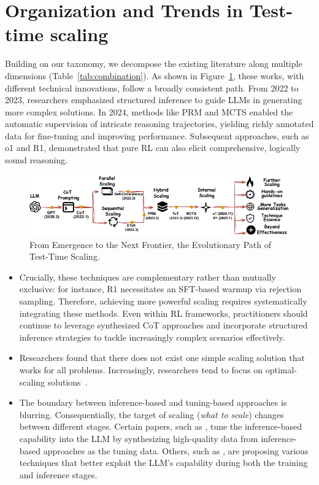 \section{Organization and Trends in Test-time scaling}
\label{sec:organizationandtrends}



Building on our taxonomy, we decompose the existing literature along multiple dimensions (Table~\ref{tab:combination}). As shown in Figure~\ref{fig:timeline}, these works, with different technical innovations, follow a broadly consistent path. From 2022 to 2023, researchers emphasized structured inference to guide LLMs in generating more complex solutions. In 2024, methods like PRM and MCTS enabled the automatic supervision of intricate reasoning trajectories, yielding richly annotated data for fine-tuning and improving \TTS performance. Subsequent approaches, such as o1 and R1, demonstrated that pure RL can also elicit comprehensive, logically sound reasoning. 

\begin{figure}[!htbp]
    \centering
    \includegraphics[width=.98\linewidth]{figures/figure1.pdf}
    \caption{From Emergence to the Next Frontier, the Evolutionary Path of Test-Time Scaling.}
    \label{fig:timeline}
\end{figure}





\begin{itemize}
    \item Crucially, these techniques are complementary rather than mutually exclusive: for instance, R1 necessitates an SFT-based warmup via rejection sampling. Therefore, achieving more powerful scaling requires systematically integrating these methods. Even within RL frameworks, practitioners should continue to leverage synthesized CoT approaches and incorporate structured inference strategies to tackle increasingly complex scenarios effectively.
    \item Researchers found that there does not exist one simple scaling solution that works for all problems. Increasingly, researchers tend to focus on optimal-scaling solutions~\citep{wu2024scaling,snell2024scaling}.
    \item The boundary between inference-based and tuning-based approaches is blurring. Consequentially, the target of scaling (\textit{what to scale}) changes between different stages. Certain papers, such as \citet{li2025draftsanswersunlockingllm, munkhbat2025selftrainingelicitsconcisereasoning}, tune the inference-based capability into the LLM by synthesizing high-quality data from inference-based approaches as the tuning data. Others, such as \citet{wan2024alphazero}, are proposing various techniques that better exploit the LLM's capability during both the training and inference stages.
\end{itemize}

